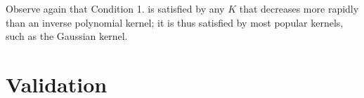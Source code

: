 Observe again that Condition 1. is satisfied by any $K$ that decreases more rapidly than an inverse polynomial kernel; it is thus satisfied by most popular kernels, such as the Gaussian kernel. 

\section{Validation}


%
%
%
%
%
%
%